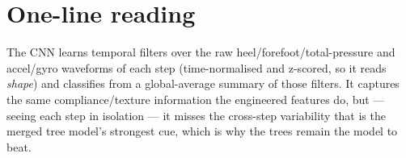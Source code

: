 \documentclass[11pt]{article}
\begin{document}
\section*{One-line reading}
The CNN learns temporal filters over the raw heel/forefoot/total-pressure and accel/gyro waveforms
of each step (time-normalised and z-scored, so it reads \emph{shape}) and classifies from a
global-average summary of those filters. It captures the same compliance/texture information the
engineered features do, but --- seeing each step in isolation --- it misses the cross-step
variability that is the merged tree model's strongest cue, which is why the trees remain the model
to beat.
\end{document}
